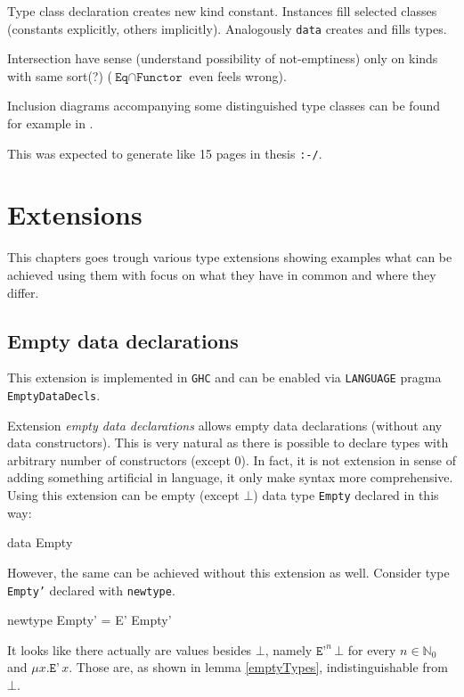 \documentclass[11pt,oneside,draft]{fithesis2}
\begin{document}
Type class declaration creates new kind constant.
Instances fill selected classes (constants explicitly, others implicitly).
Analogously \texttt{data} creates and fills types.

Intersection have sense (understand possibility of not-emptiness) only on
kinds with same sort(?) (\(\texttt{Eq} \cap \texttt{Functor}\) even feels wrong).

Inclusion diagrams accompanying some distinguished type classes can be found for
example in \cite{typeclassopedia}.

This was expected to generate like 15 pages in thesis \verb~:-/~.

\chapter{Extensions}

This chapters goes trough various type extensions showing examples
what can be achieved using them with focus on what they have in common
and where they differ.

\section{Empty data declarations}

This extension is implemented in \texttt{GHC} and can be enabled via
\texttt{LANGUAGE} pragma \texttt{EmptyDataDecls}.

Extension \emph{empty data declarations} allows empty data declarations
(without any data constructors). This is very natural as there is possible
to declare types with arbitrary number of constructors (except 0). In
fact, it is not extension in sense of adding something artificial in
language, it only make syntax more comprehensive. Using this extension can
be empty (except \(\bot\)) data type \texttt{Empty} declared in this way:
\begin{code}
data Empty
\end{code}
However, the same can be achieved without this extension as well. Consider type \texttt{Empty'}
declared with \texttt{newtype}.
\begin{code}
newtype Empty' = E' Empty'
\end{code}
It looks like there actually are values besides \(\bot\), namely \(\texttt{E'}^n \, \bot\)
for every \(n \in \mathbb{N}_0\) and \(\mu x . \texttt{E'} \, x\).
Those are, as shown in lemma \ref{emptyTypes}, indistinguishable from \(\bot\).
\end{document}
